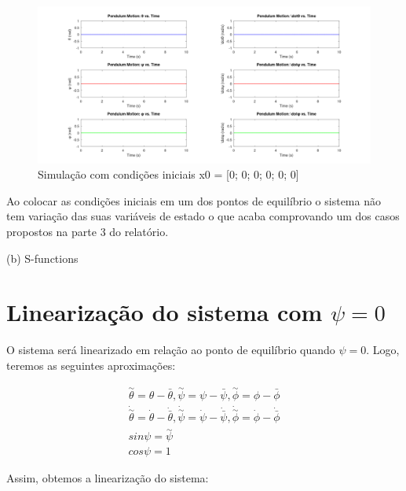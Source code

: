 \documentclass[10pt]{article}
\begin{document}
\begin{figure}[h]
    \centering
    \includegraphics[scale=0.229]{ode45_2.png}
    \caption{Simulação com condições iniciais x0 = [0; 0; 0; 0; 0; 0]}
\end{figure}

\quad Ao colocar as condições iniciais em um dos pontos de equilíbrio o sistema não tem variação das suas variáveis de estado
o que acaba comprovando um dos casos propostos na parte 3 do relatório.

\newpage

\quad (b) S-functions

\section{Linearização do sistema com $\psi = 0$}

\quad O sistema será linearizado em relação ao ponto de equilíbrio quando $\psi = 0$. Logo,
teremos as seguintes aproximações:

\begin{equation}
\begin{gathered}
    \overset{\sim}{\theta} = \theta - \bar\theta ,
    \overset{\sim}{\psi} = \psi - \bar\psi ,
    \overset{\sim}{\phi} = \phi - \bar\phi \\
    \dot{\overset{\sim}{\theta}} = \dot\theta - \dot{\bar\theta} ,
    \dot{\overset{\sim}{\psi}} = \dot\psi - \dot{\bar\psi} ,
    \dot{\overset{\sim}{\phi}} = \dot\phi - \dot{\bar\phi} \\
    sin{\psi} = \overset{\sim}{\psi} \\
    cos{\psi} = 1
\end{gathered}
\end{equation}

\quad Assim, obtemos a linearização do sistema:
\end{document}

